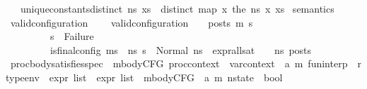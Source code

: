 \begin{isabellebody}
\ \ \ {\isachardoublequoteopen}unique{\isacharunderscore}{\kern0pt}constants{\isacharunderscore}{\kern0pt}distinct\ ns\ xs\ {\isasymlongleftrightarrow}\ distinct\ {\isacharparenleft}{\kern0pt}map\ {\isacharparenleft}{\kern0pt}{\isasymlambda}x{\isachardot}{\kern0pt}\ the\ {\isacharparenleft}{\kern0pt}ns\ x{\isacharparenright}{\kern0pt}{\isacharparenright}{\kern0pt}\ xs{\isacharparenright}{\kern0pt}{\isachardoublequoteclose}\isanewline
\isanewline
\isanewline
{}\isamarkupfalse%
\ semantics\ \isanewline
\isanewline
{}\isamarkupfalse%
\ valid{\isacharunderscore}{\kern0pt}configuration\ \isanewline
\ \ \ {\isachardoublequoteopen}valid{\isacharunderscore}{\kern0pt}configuration\ {\isasymLambda}\ {\isasymGamma}\ {\isasymOmega}\ posts\ m{\isacharprime}{\kern0pt}\ s{\isacharprime}{\kern0pt}\ {\isasymequiv}\ \isanewline
\ \ \ \ \ \ \ \ \ s{\isacharprime}{\kern0pt}\ {\isasymnoteq}\ Failure\ {\isasymand}\ \isanewline
\ \ \ \ \ \ \ \ \ {\isacharparenleft}{\kern0pt}is{\isacharunderscore}{\kern0pt}final{\isacharunderscore}{\kern0pt}config\ {\isacharparenleft}{\kern0pt}m{\isacharprime}{\kern0pt}{\isacharcomma}{\kern0pt}s{\isacharprime}{\kern0pt}{\isacharparenright}{\kern0pt}\ {\isasymlongrightarrow}\ {\isacharparenleft}{\kern0pt}{\isasymforall}ns{\isacharprime}{\kern0pt}{\isachardot}{\kern0pt}\ s{\isacharprime}{\kern0pt}\ {\isacharequal}{\kern0pt}\ Normal\ ns{\isacharprime}{\kern0pt}\ {\isasymlongrightarrow}\ expr{\isacharunderscore}{\kern0pt}all{\isacharunderscore}{\kern0pt}sat\ {\isasymLambda}\ {\isasymGamma}\ {\isasymOmega}\ ns{\isacharprime}{\kern0pt}\ posts{\isacharparenright}{\kern0pt}{\isacharparenright}{\kern0pt}{\isachardoublequoteclose}\isanewline
\isanewline
{}\isamarkupfalse%
\ proc{\isacharunderscore}{\kern0pt}body{\isacharunderscore}{\kern0pt}satisfies{\isacharunderscore}{\kern0pt}spec\ {\isacharcolon}{\kern0pt}{\isacharcolon}{\kern0pt}\ {\isachardoublequoteopen}mbodyCFG\ proc{\isacharunderscore}{\kern0pt}context\ {\isasymRightarrow}\ var{\isacharunderscore}{\kern0pt}context\ {\isasymRightarrow}\ {\isacharparenleft}{\kern0pt}{\isacharprime}{\kern0pt}a{\isacharcomma}{\kern0pt}\ {\isacharprime}{\kern0pt}m{\isacharparenright}{\kern0pt}\ fun{\isacharunderscore}{\kern0pt}interp\ {\isasymRightarrow}\ rtype{\isacharunderscore}{\kern0pt}env\ {\isasymRightarrow}\ expr\ list\ {\isasymRightarrow}\ expr\ list\ {\isasymRightarrow}\ mbodyCFG\ {\isasymRightarrow}\ {\isacharparenleft}{\kern0pt}{\isacharprime}{\kern0pt}a{\isacharcomma}{\kern0pt}\ {\isacharprime}{\kern0pt}m{\isacharparenright}{\kern0pt}\ nstate\ {\isasymRightarrow}\ bool{\isachardoublequoteclose}\isanewline

\end{isabellebody}
